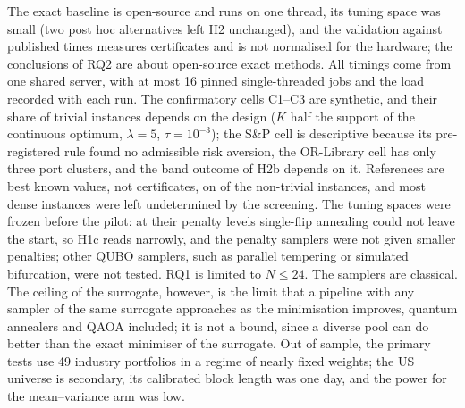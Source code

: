 The exact baseline is open-source and runs on one thread, its tuning space was small (two post hoc alternatives left
H2 unchanged), and the validation against published times measures certificates and is not normalised for the
hardware; the conclusions of RQ2 are about open-source exact methods. All timings come from one shared
server, with at most 16 pinned single-threaded jobs and the load recorded with each run. The confirmatory cells C1--C3
are synthetic, and their share of trivial instances depends on the design ($K$ half the support of the continuous
optimum, $\lambda = 5$, $\tau = 10^{-3}$); the S\&P cell is descriptive because its pre-registered rule found no
admissible risk aversion, the OR-Library cell has only three port clusters, and the band outcome of H2b depends on it.
References are best known values, not certificates, on  of the  non-trivial
instances, and most dense instances were left undetermined by the screening. The tuning spaces were frozen before the
pilot: at their penalty levels single-flip annealing could not leave the start, so H1c reads narrowly, and the penalty
samplers were not given smaller penalties; other QUBO samplers, such as parallel tempering or simulated bifurcation,
were not tested. RQ1 is limited to $N \le 24$. The samplers are classical. The ceiling of the surrogate, however, is
the limit that a pipeline with any sampler of the same surrogate approaches as the minimisation improves, quantum
annealers and QAOA included; it is not a bound, since a diverse pool can do better than the exact minimiser of the
surrogate. Out of sample, the primary tests use 49 industry portfolios in a regime of nearly fixed weights; the US
universe is secondary, its calibrated block length was one day, and the power for the mean--variance arm was low.
